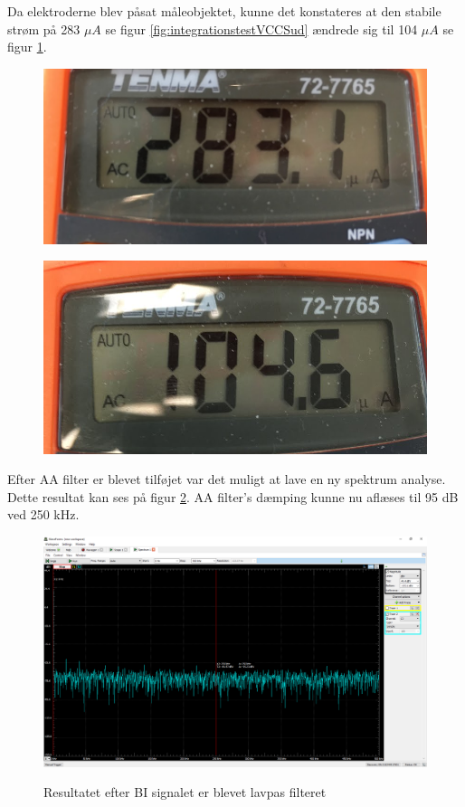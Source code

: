 Da elektroderne blev påsat måleobjektet, kunne det konstateres at den stabile strøm på 283 $\mu A$ se figur \ref{fig:integrationstestVCCSud} ændrede sig til 104 $\mu A$ se figur \ref{fig:integrationstestINA2udstrom}.

\begin{figure}[H]
\centering
\begin{minipage}{.5\textwidth}
  \centering
  \includegraphics[width=.6\linewidth]{Figure/integrationstestVCCSud}
  \label{fig:integrationstestVCCSud}
\end{minipage}%
\begin{minipage}{.5\textwidth}
  \centering
  \includegraphics[width=.6\linewidth]{Figure/integrationstestINA2udstrom}
  \label{fig:integrationstestINA2udstrom}
\end{minipage}
\end{figure}

Efter AA filter er blevet tilføjet var det muligt at lave en ny spektrum analyse. Dette resultat kan ses på figur \ref{fig:integrationstestAAspectrum}. AA filter's dæmping kunne nu aflæses til 95 dB ved 250 kHz.

\begin{figure}[H] 
\centering
{\includegraphics[width=\linewidth]
{Figure/integrationstestAAspectrum}}
\caption{Resultatet efter BI signalet er blevet lavpas filteret}
\label{fig:integrationstestAAspectrum}
\end{figure}


